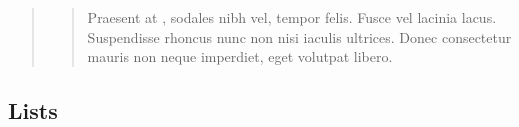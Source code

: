 \documentclass[letterpaper,10pt,english]{sphinxmanual}
\begin{document}
\begin{sphinxVerbatim}[commandchars=\\\{\}]
    
           
       \PYG{p}{[}\PYG{p}{]}
         
      \PYG{p}{[}\PYG{p}{]}  \PYG{p}{[}\PYG{p}{]}
   
\end{sphinxVerbatim}
\begin{quote}
\begin{quote}

Praesent at , sodales nibh vel, tempor felis. Fusce
vel lacinia lacus. Suspendisse rhoncus nunc non nisi iaculis ultrices.
Donec consectetur mauris non neque imperdiet, eget volutpat libero.
\end{quote}
\end{quote}


\subsection{Lists}
\label{\detokenize{markdown:lists}}
\end{document}
